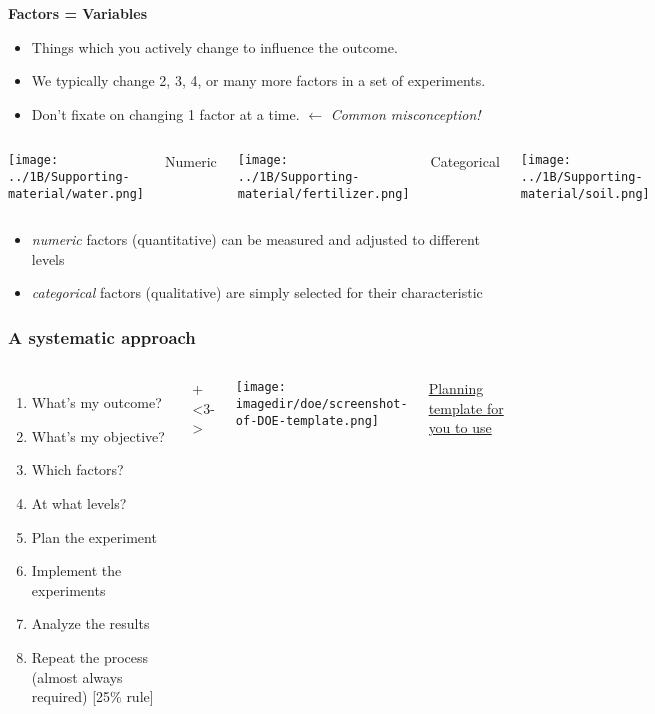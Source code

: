 \documentclass[11pt,aspectratio=169,mathserif]{beamer}
\begin{document}
\begin{frame}\frametitle{}
	\vspace{12pt}
	\textbf{{\color{purple} Factors = Variables}}
		\begin{itemize}
			\item	Things which you actively change to influence the outcome.
			\item	We typically change 2, 3, 4, or many more factors in a set of experiments. \pause
			\item	Don't fixate on changing 1 factor at a time. {\color{myOrange}  $\longleftarrow$	\emph{Common misconception!}}
		\end{itemize}
	
	\begin{columns}[T]
			\centerline{\texttt{[image: ../1B/Supporting-material/water.png]}}
			
			\centerline{Numeric}


			\centerline{\texttt{[image: ../1B/Supporting-material/fertilizer.png]}}
			
			\centerline{Categorical}


			\centerline{\texttt{[image: ../1B/Supporting-material/soil.png]}}
	\end{columns}
	
	\begin{itemize}
		\item	\emph{numeric} factors (quantitative) can be measured and adjusted to different levels
		\item	\emph{categorical} factors (qualitative) are simply selected for their characteristic
	\end{itemize}	
\end{frame}
\begin{frame}\frametitle{A systematic approach} 
	\begin{columns}[T]
			\Large
			\begin{enumerate}
			\item	What's my outcome? 
			\item	What's my objective? \pause
			\item	Which factors? 
			\item	At what levels?\pause
			\item	Plan the experiment \pause
			\item	Implement the experiments \pause
			\item	Analyze the results\pause
			\item	Repeat the process \newline (almost always required) [25\% rule]
			\end{enumerate}
			
			\onslide+<3->{
				\texttt{[image: \\imagedir/doe/screenshot-of-DOE-template.png]}
				
				\vspace{8pt}
				\small
				{\color{purple}  \href{https://yint.org/template}{Planning template for you to use}}
			}
	\end{columns}
\end{frame}
\end{document}
